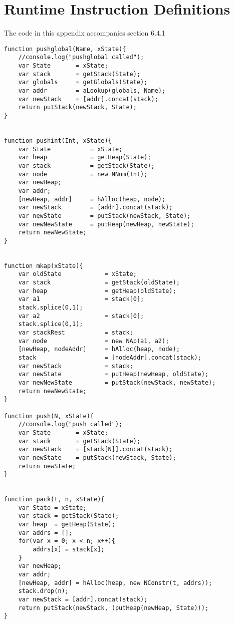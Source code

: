 \appendix

\section{Runtime Instruction Definitions}
The code in this appendix accompanies section 6.4.1

\begin{verbatim}
function pushglobal(Name, xState){
    //console.log("pushglobal called"); 
    var State       = xState;   
    var stack       = getStack(State);
    var globals     = getGlobals(State);
    var addr        = aLookup(globals, Name);
    var newStack    = [addr].concat(stack);
    return putStack(newStack, State);
}  


function pushint(Int, xState){
    var State           = xState;
    var heap            = getHeap(State);
    var stack           = getStack(State);
    var node            = new NNum(Int);
    var newHeap;
    var addr;
    [newHeap, addr]     = hAlloc(heap, node);
    var newStack        = [addr].concat(stack);
    var newState        = putStack(newStack, State);
    var newNewState     = putHeap(newHeap, newState);
    return newNewState;
}   


function mkap(xState){
    var oldState            = xState;
    var stack               = getStack(oldState);
    var heap                = getHeap(oldState);    
    var a1                  = stack[0];
    stack.splice(0,1);
    var a2                  = stack[0];
    stack.splice(0,1);
    var stackRest           = stack;
    var node                = new NAp(a1, a2);
    [newHeap, nodeAddr]     = hAlloc(heap, node);
    stack                   = [nodeAddr].concat(stack);
    var newStack            = stack;
    var newState            = putHeap(newHeap, oldState);
    var newNewState         = putStack(newStack, newState);
    return newNewState;
} 

function push(N, xState){
    //console.log("push called");
    var State       = xState;
    var stack       = getStack(State);
    var newStack    = [stack[N]].concat(stack);
    var newState    = putStack(newStack, State);
    return newState;
}  


function pack(t, n, xState){
    var State = xState;
    var stack = getStack(State);
    var heap  = getHeap(State);
    var addrs = [];
    for(var x = 0; x < n; x++){
        addrs[x] = stack[x];
    }
    var newHeap;
    var addr;
    [newHeap, addr] = hAlloc(heap, new NConstr(t, addrs));
    stack.drop(n);
    var newStack = [addr].concat(stack);
    return putStack(newStack, (putHeap(newHeap, State)));
}



\end{verbatim}
